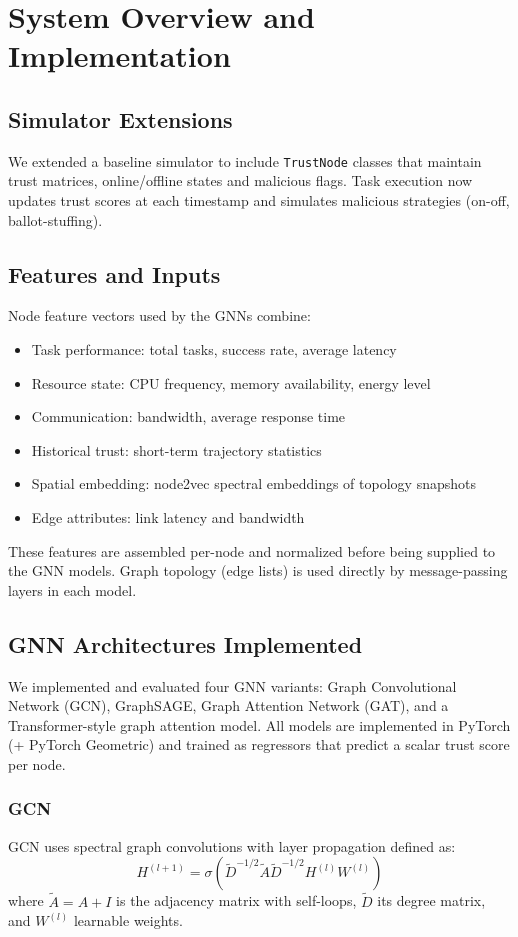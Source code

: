 \documentclass[12pt,a4paper]{article}
\begin{document}
\section{System Overview and Implementation}
\subsection{Simulator Extensions}
We extended a baseline simulator to include \texttt{TrustNode} classes that maintain trust matrices, online/offline states and malicious flags. Task execution now updates trust scores at each timestamp and simulates malicious strategies (on-off, ballot-stuffing).

\subsection{Features and Inputs}
Node feature vectors used by the GNNs combine:
\begin{itemize}
  \item Task performance: total tasks, success rate, average latency
  \item Resource state: CPU frequency, memory availability, energy level
  \item Communication: bandwidth, average response time
  \item Historical trust: short-term trajectory statistics
  \item Spatial embedding: node2vec spectral embeddings of topology snapshots
  \item Edge attributes: link latency and bandwidth
\end{itemize}
These features are assembled per-node and normalized before being supplied to the GNN models. Graph topology (edge lists) is used directly by message-passing layers in each model.

\subsection{GNN Architectures Implemented}
We implemented and evaluated four GNN variants: Graph Convolutional Network (GCN), GraphSAGE, Graph Attention Network (GAT), and a Transformer-style graph attention model. All models are implemented in PyTorch (+ PyTorch Geometric) and trained as regressors that predict a scalar trust score per node.

\subsubsection{GCN}
GCN uses spectral graph convolutions with layer propagation defined as:
\begin{equation}
H^{(l+1)} = \sigma(\tilde{D}^{-1/2}\tilde{A}\tilde{D}^{-1/2} H^{(l)} W^{(l)})
\end{equation}
where $\tilde{A}=A+I$ is the adjacency matrix with self-loops, $\tilde{D}$ its degree matrix, and $W^{(l)}$ learnable weights.
\end{document}
